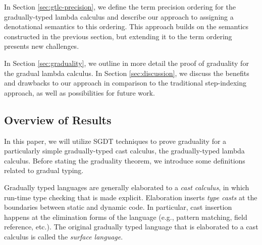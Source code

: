 In Section \ref{sec:gtlc-precision}, we define the term precision ordering for
the gradually-typed lambda calculus and describe our approach to assigning a
denotational semantics to this ordering.
This approach builds on the semantics constructed in the previous section,
but extending it to the term ordering presents new challenges.


%
%
In Section \ref{sec:graduality}, we outline in more detail the proof of graduality for the
gradual lambda calculus.
%
In Section \ref{sec:discussion}, we discuss the benefits and drawbacks to our approach in comparison
to the traditional step-indexing approach, as well as possibilities for future work.

\subsection{Overview of Results}\label{sec:overview}



In this paper, we will utilize SGDT techniques to prove graduality for a particularly
simple gradually-typed cast calculus, the gradually-typed lambda calculus.
Before stating the graduality theorem, we introduce some definitions related to gradual typing.

Gradually typed languages are generally elaborated to a \emph{cast calculus}, in which run-time type checking
that is made explicit. Elaboration inserts \emph{type casts} at the boundaries between static and dynamic code.
In particular, cast insertion happens at the elimination forms of the language (e.g., pattern matching, field reference, etc.).
The original gradually typed language that is elaborated to a cast calculus is called the \emph{surface language}.

